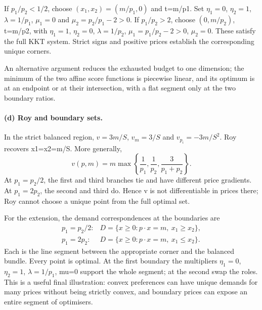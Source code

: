 \documentclass[11pt,a4paper]{article}
\begin{document}
If $p_1/p_2<1/2$, choose $(x_1,x_2)=(m/p_1,0)$ and t=m/p1. Set $\eta_1=0$, $\eta_2=1$, $\lambda=1/p_1$, $\mu_1=0$ and $\mu_2=p_2/p_1-2>0$. If $p_1/p_2>2$, choose $(0,m/p_2)$, t=m/p2, with $\eta_1=1$, $\eta_2=0$, $\lambda=1/p_2$, $\mu_1=p_1/p_2-2>0$, $\mu_2=0$. These satisfy the full KKT system. Strict signs and positive prices establish the corresponding unique corners.

An alternative argument reduces the exhausted budget to one dimension; the minimum of the two affine score functions is piecewise linear, and its optimum is at an endpoint or at their intersection, with a flat segment only at the two boundary ratios.
\paragraph{(d) Roy and boundary sets.}
In the strict balanced region, $v=3m/S$, $v_m=3/S$ and $v_{p_i}=-3m/S^2$. Roy recovers x1=x2=m/S. More generally,
\[
 v(p,m)=m\max\left\{\frac1{p_1},\frac1{p_2},\frac3{p_1+p_2}\right\}.
\]
At $p_1=p_2/2$, the first and third branches tie and have different price gradients. At $p_1=2p_2$, the second and third do. Hence v is not differentiable in prices there; Roy cannot choose a unique point from the full optimal set.

For the extension, the demand correspondences at the boundaries are
\[
 \begin{array}{ll}
 p_1=p_2/2:&D=\{x\ge0:p\cdot x=m,\ x_1\ge x_2\},\\
 p_1=2p_2:&D=\{x\ge0:p\cdot x=m,\ x_1\le x_2\}.
 \end{array}
\]
Each is the line segment between the appropriate corner and the balanced bundle. Every point is optimal. At the first boundary the multipliers $\eta_1=0$, $\eta_2=1$, $\lambda=1/p_1$, mu=0 support the whole segment; at the second swap the roles. This is a useful final illustration: convex preferences can have unique demands for many prices without being strictly convex, and boundary prices can expose an entire segment of optimisers.
\end{document}
